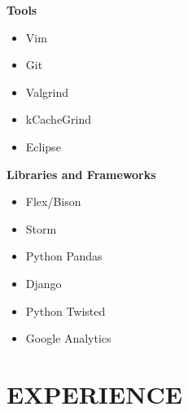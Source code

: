 \documentclass[overlapped]{res}
\begin{document}
\begin{resume}
\begin{multicols}{3}
        \textbf{Tools}
        \begin{itemize}
            \item Vim
            \item Git
            \item Valgrind
            \item kCacheGrind
            \item Eclipse
        \end{itemize}
        \columnbreak

        \textbf{Libraries and Frameworks}
        \begin{itemize}
            \item Flex/Bison
            \item Storm
            \item Python Pandas
            \item Django
            \item Python Twisted
            \item Google Analytics
        \end{itemize}
    \end{multicols}

\section{EXPERIENCE}
\vspace{0.125in}


\end{resume}
\end{document}

